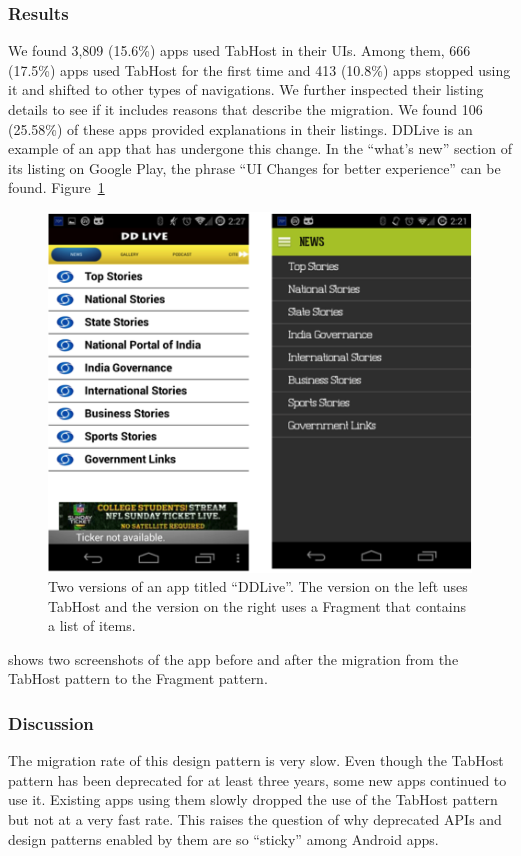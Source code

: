 \subsubsection{Results}
We found 3,809 (15.6\%) apps used TabHost in their UIs. 
Among them, 666 (17.5\%) apps used TabHost for the first time and 413 (10.8\%) apps stopped using it and shifted to other types of navigations. 
We further inspected their listing details to see if it includes reasons that describe the migration. 
We found 106 (25.58\%) of these apps provided explanations in their listings. 
DDLive is an example of an app that has undergone this change. 
In the ``what's new'' section of its listing on Google Play, the phrase ``UI Changes for better experience'' can be found. 
Figure~\ref{fig:fig_tabhost}
\begin{figure}[!t]
	\centering
	\includegraphics{figures/design-pattern-changes/tabhost}
	\caption{Two versions of an app titled ``DDLive''. The version on the left uses TabHost and the version on the right uses a Fragment that contains a list of items.}
	\label{fig:fig_tabhost}
\end{figure}
shows two screenshots of the app before and after the migration from the TabHost pattern to the Fragment pattern.

\subsubsection{Discussion}
The migration rate of this design pattern is very slow. 
Even though the TabHost pattern has been deprecated for at least three years, some new apps continued to use it. 
Existing apps using them slowly dropped the use of the TabHost pattern but not at a very fast rate. 
This raises the question of why deprecated APIs and design patterns enabled by them are so ``sticky'' among Android apps.

